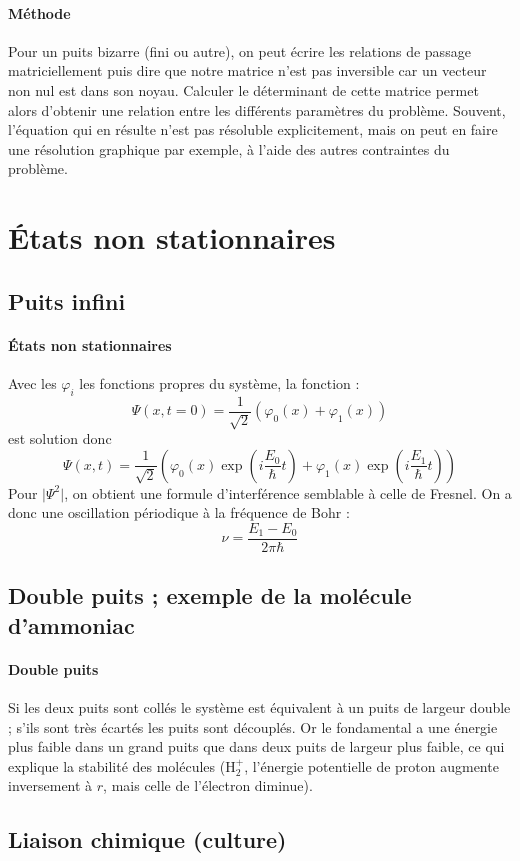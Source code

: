 \documentclass[french]{book}
\theoremstyle{plain}
\theoremstyle{definition}
\theoremstyle{remark}
\begin{document}
\paragraph{Méthode} Pour un puits bizarre (fini ou autre), on peut écrire les relations de passage matriciellement puis dire que notre matrice n'est pas inversible car un vecteur non nul est dans son noyau. Calculer le déterminant de cette matrice permet alors d'obtenir une relation entre les différents paramètres du problème. Souvent, l'équation qui en résulte n'est pas résoluble explicitement, mais on peut en faire une résolution graphique par exemple, à l'aide des autres contraintes du problème.
\section{États non stationnaires}
\subsection{Puits infini}
\paragraph{États non stationnaires} Avec les $\varphi_i$ les fonctions propres du système, la fonction : $$\Psi(x,t=0)=\frac{1}{\sqrt{2}}\left(\varphi_0(x)+\varphi_1(x)\right)$$ est solution donc $$\Psi(x,t)=\frac{1}{\sqrt{2}}\left(\varphi_0(x)\exp\left(i\frac{E_0}{\hbar}t\right)+\varphi_1(x)\exp\left(i\frac{E_1}{\hbar}t\right)\right)$$ Pour $\lvert \Psi^2 \rvert$, on obtient une formule d'interférence semblable à celle de Fresnel. On a donc une oscillation périodique à la fréquence de Bohr : $$\nu=\frac{E_1-E_0}{2\pi\hbar}$$
\subsection{Double puits ; exemple de la molécule d'ammoniac}
\paragraph{Double puits} Si les deux puits sont collés le système est équivalent à un puits de largeur double ; s’ils sont très écartés les puits sont découplés. Or le fondamental a une énergie plus faible dans un grand puits que dans deux puits de largeur plus faible, ce qui explique la stabilité des molécules ($\text{H}_2^+$, l’énergie potentielle de proton augmente inversement à $r$, mais celle de l’électron diminue).
\subsection{Liaison chimique (culture)}
\end{document}
